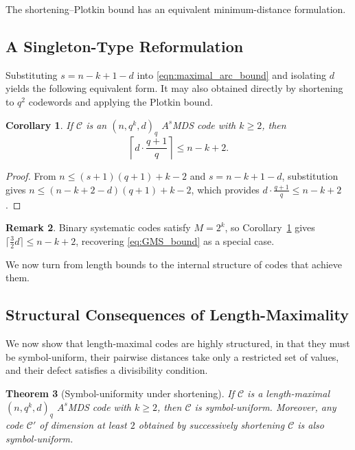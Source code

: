 \documentclass[12pt, letterpaper]{article}
\theoremstyle{plain}
\newtheorem{theorem}{Theorem}[section]
\newtheorem{corollary}[theorem]{Corollary}
\theoremstyle{definition}
\newtheorem{remark}[theorem]{Remark}
\newcommand{\mc}[1]{\mathcal{#1}}
\begin{document}
	The shortening--Plotkin bound has an equivalent minimum-distance formulation.
	
	\subsection{A Singleton-Type Reformulation}
	\label{sec:new_singleton}
	
	Substituting $s = n-k+1-d$ into \eqref{eqn:maximal_arc_bound} and isolating $d$ yields the following equivalent form. It may also obtained directly by shortening to $q^2$ codewords and applying the Plotkin bound.
	
	\begin{corollary}\label{cor:new_singleton}
		If $\mathcal{C}$ is an $(n, q^k, d)_q$ $A^s$MDS code with $k \ge 2$, then
		\[
		\left\lceil d \cdot \frac{q+1}{q} \right\rceil \le n - k + 2.
		\]
	\end{corollary}
	
	\begin{proof}
		From $n \le (s+1)(q+1) + k - 2$ and $s = n - k + 1 - d$, substitution gives $n \le (n - k + 2 - d)(q+1) + k - 2$, which provides $d \cdot \frac{q+1}{q} \le n - k + 2$.
	\end{proof}
	
	\begin{remark}
		Binary systematic codes satisfy $M = 2^k$, so Corollary~\ref{cor:new_singleton} gives $\lceil \frac{3}{2}d \rceil \le n - k + 2$, recovering \eqref{eq:GMS_bound} as a special case.
	\end{remark}
	
We now turn from length bounds to the internal structure of codes that achieve them.
	
	\subsection{Structural Consequences of Length-Maximality}
	\label{sec:structure}
	
	We now show that length-maximal codes are highly structured, in that they must be symbol-uniform, their pairwise distances take only a restricted set of values, and their defect satisfies a divisibility condition.
	
	\begin{theorem}[Symbol-uniformity under shortening]
		\label{thm:optimal_uniform}
		If $\mc{C}$ is a length-maximal $(n, q^k, d)_q$ $A^s$MDS code with $k \ge 2$, then $\mc{C}$ is symbol-uniform. Moreover, any code $\mc{C}'$ of dimension at least $2$
		obtained by successively shortening $\mc{C}$ is also symbol-uniform.
	\end{theorem}
	
\end{document}
